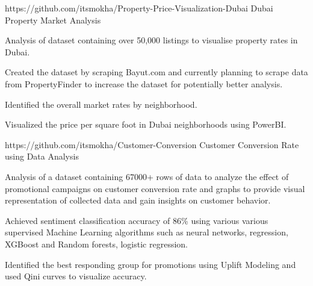 

\begin{cventries}

  \cventry
    {https://github.com/itsmokha/Property-Price-Visualization-Dubai} %
    {Dubai Property Market Analysis} %
    {}
    {}
    {
      \begin{cvitems} %
		\item Analysis of dataset containing over 50,000 listings to visualise property rates in Dubai.
		\item Created the dataset by scraping Bayut.com and currently planning to scrape data from PropertyFinder to increase the dataset for potentially better analysis. 
		\item Identified the overall market rates by neighborhood.
		\item Visualized the price per square foot in Dubai neighborhoods using PowerBI.
      \end{cvitems}
    }

  \cventry
    {https://github.com/itsmokha/Customer-Conversion} %
    {Customer Conversion Rate using Data Analysis} %
    {}
    {}
    {
      \begin{cvitems} %
		\item Analysis of a dataset containing 67000+ rows of data to analyze the effect of promotional campaigns on customer conversion rate  and graphs to provide visual representation of collected data and gain insights on customer behavior.
		\item Achieved sentiment classification accuracy of 86\% using various various supervised Machine Learning algorithms such as neural networks, regression, XGBoost and Random forests, logistic regression.
		\item Identified the best responding group for promotions using Uplift Modeling and used Qini curves to visualize accuracy.
      \end{cvitems}
    }


\end{cventries}
